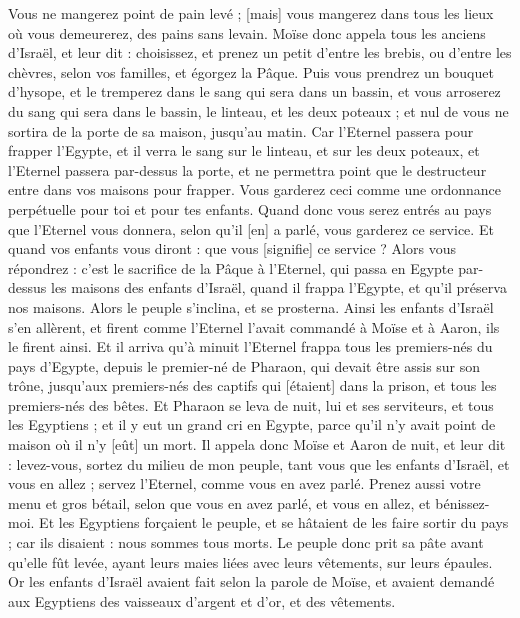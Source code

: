 \begin{multicols}{2}
Vous ne mangerez point de pain levé ; [mais] vous mangerez dans tous les lieux où vous demeurerez, des pains sans levain.
Moïse donc appela tous les anciens d'Israël, et leur dit : choisissez, et prenez un petit d'entre les brebis, ou d'entre les chèvres, selon vos familles, et égorgez la Pâque.
Puis vous prendrez un bouquet d'hysope, et le tremperez dans le sang qui sera dans un bassin, et vous arroserez du sang qui sera dans le bassin, le linteau, et les deux poteaux ; et nul de vous ne sortira de la porte de sa maison, jusqu'au matin.
Car l'Eternel passera pour frapper l'Egypte, et il verra le sang sur le linteau, et sur les deux poteaux, et l'Eternel passera par-dessus la porte, et ne permettra point que le destructeur entre dans vos maisons pour frapper.
Vous garderez ceci comme une ordonnance perpétuelle pour toi et pour tes enfants.
Quand donc vous serez entrés au pays que l'Eternel vous donnera, selon qu'il [en] a parlé, vous garderez ce service.
Et quand vos enfants vous diront : que vous [signifie] ce service ?
Alors vous répondrez : c'est le sacrifice de la Pâque à l'Eternel, qui passa en Egypte par-dessus les maisons des enfants d'Israël, quand il frappa l'Egypte, et qu'il préserva nos maisons. Alors le peuple s'inclina, et se prosterna.
Ainsi les enfants d'Israël s'en allèrent, et firent comme l'Eternel l'avait commandé à Moïse et à Aaron, ils le firent ainsi.
Et il arriva qu'à minuit l'Eternel frappa tous les premiers-nés du pays d'Egypte, depuis le premier-né de Pharaon, qui devait être assis sur son trône, jusqu'aux premiers-nés des captifs qui [étaient] dans la prison, et tous les premiers-nés des bêtes.
Et Pharaon se leva de nuit, lui et ses serviteurs, et tous les Egyptiens ; et il y eut un grand cri en Egypte, parce qu'il n'y avait point de maison où il n'y [eût] un mort.
Il appela donc Moïse et Aaron de nuit, et leur dit : levez-vous, sortez du milieu de mon peuple, tant vous que les enfants d'Israël, et vous en allez ; servez l'Eternel, comme vous en avez parlé.
Prenez aussi votre menu et gros bétail, selon que vous en avez parlé, et vous en allez, et bénissez-moi.
Et les Egyptiens forçaient le peuple, et se hâtaient de les faire sortir du pays ; car ils disaient : nous sommes tous morts.
Le peuple donc prit sa pâte avant qu'elle fût levée, ayant leurs maies liées avec leurs vêtements, sur leurs épaules.
Or les enfants d'Israël avaient fait selon la parole de Moïse, et avaient demandé aux Egyptiens des vaisseaux d'argent et d'or, et des vêtements.

\end{multicols}

